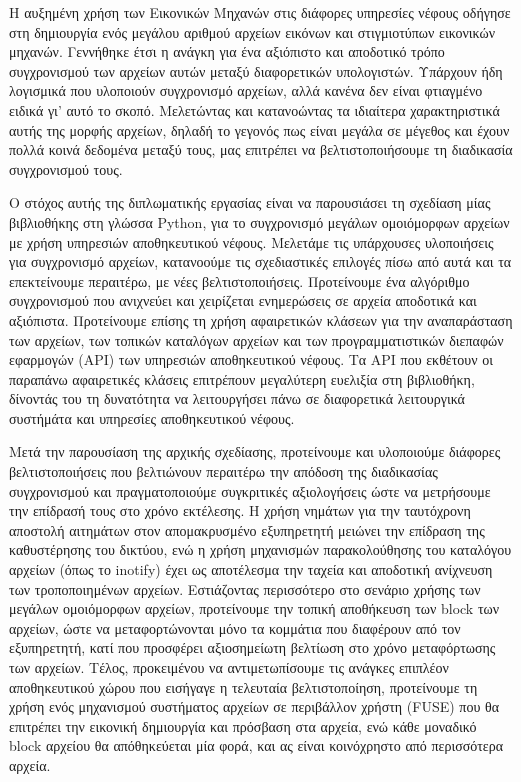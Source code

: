 
\begin{abstractgr}
  Η αυξημένη χρήση των Εικονικών Μηχανών στις διάφορες υπηρεσίες νέφους οδήγησε στη δημιουργία ενός μεγάλου αριθμού αρχείων εικόνων και στιγμιοτύπων εικονικών μηχανών. Γεννήθηκε έτσι η ανάγκη για ένα αξιόπιστο και αποδοτικό τρόπο συγχρονισμού των αρχείων αυτών μεταξύ διαφορετικών υπολογιστών. Υπάρχουν ήδη λογισμικά που υλοποιούν συγχρονισμό αρχείων, αλλά κανένα δεν είναι φτιαγμένο ειδικά γι' αυτό το σκοπό. Μελετώντας και κατανοώντας τα ιδιαίτερα χαρακτηριστικά αυτής της μορφής αρχείων, δηλαδή το γεγονός πως είναι μεγάλα σε μέγεθος και έχουν πολλά κοινά δεδομένα μεταξύ τους, μας επιτρέπει να βελτιστοποιήσουμε τη διαδικασία συγχρονισμού τους.

  Ο στόχος αυτής της διπλωματικής εργασίας είναι να παρουσιάσει τη σχεδίαση μίας βιβλιοθήκης στη γλώσσα Python, για το συγχρονισμό μεγάλων ομοιόμορφων αρχείων με χρήση υπηρεσιών αποθηκευτικού νέφους. Μελετάμε τις υπάρχουσες υλοποιήσεις για συγχρονισμό αρχείων, κατανοούμε τις σχεδιαστικές επιλογές πίσω από αυτά και τα επεκτείνουμε περαιτέρω, με νέες βελτιστοποιήσεις. Προτείνουμε ένα αλγόριθμο συγχρονισμού που ανιχνεύει και χειρίζεται ενημερώσεις σε αρχεία αποδοτικά και αξιόπιστα. Προτείνουμε επίσης τη χρήση αφαιρετικών κλάσεων για την αναπαράσταση των αρχείων, των τοπικών καταλόγων αρχείων και των προγραμματιστικών διεπαφών εφαρμογών (API) των υπηρεσιών αποθηκευτικού νέφους. Τα API που εκθέτουν οι παραπάνω αφαιρετικές κλάσεις επιτρέπουν μεγαλύτερη ευελιξία στη βιβλιοθήκη, δίνοντάς του τη δυνατότητα να λειτουργήσει πάνω σε διαφορετικά λειτουργικά συστήμάτα και υπηρεσίες αποθηκευτικού νέφους.

  Μετά την παρουσίαση της αρχικής σχεδίασης, προτείνουμε και υλοποιούμε διάφορες βελτιστοποιήσεις που βελτιώνουν περαιτέρω την απόδοση της διαδικασίας συγχρονισμού και πραγματοποιούμε συγκριτικές αξιολογήσεις ώστε να μετρήσουμε την επίδρασή τους στο χρόνο εκτέλεσης. Η χρήση νημάτων για την ταυτόχρονη αποστολή αιτημάτων στον απομακρυσμένο εξυπηρετητή μειώνει την επίδραση της καθυστέρησης του δικτύου, ενώ η χρήση μηχανισμών παρακολούθησης του καταλόγου αρχείων (όπως το inotify) έχει ως αποτέλεσμα την ταχεία και αποδοτική ανίχνευση των τροποποιημένων αρχείων. Εστιάζοντας περισσότερο στο σενάριο χρήσης των μεγάλων ομοιόμορφων αρχείων, προτείνουμε την τοπική αποθήκευση των block των αρχείων, ώστε να μεταφορτώνονται μόνο τα κομμάτια που διαφέρουν από τον εξυπηρετητή, κατί που προσφέρει αξιοσημείωτη βελτίωση στο χρόνο μεταφόρτωσης των αρχείων. Τέλος, προκειμένου να αντιμετωπίσουμε τις ανάγκες επιπλέον αποθηκευτικού χώρου που εισήγαγε η τελευταία βελτιστοποίηση, προτείνουμε τη χρήση ενός μηχανισμού συστήματος αρχείων σε περιβάλλον χρήστη (FUSE) που θα επιτρέπει την εικονική δημιουργία και πρόσβαση στα αρχεία, ενώ κάθε μοναδικό block αρχείου θα απόθηκεύεται μία φορά, και ας είναι κοινόχρηστο από περισσότερα αρχεία.


\end{abstractgr}
